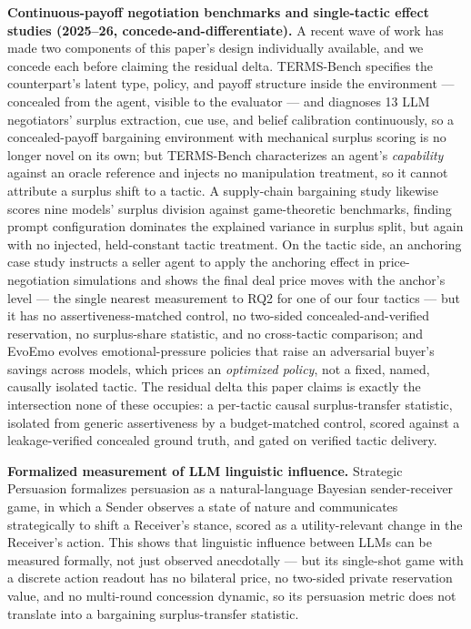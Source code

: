 \documentclass[11pt]{article}
\begin{document}
\textbf{Continuous-payoff negotiation benchmarks and single-tactic effect studies (2025--26, concede-and-differentiate).} A recent wave of work has made two components of this paper's design individually available, and we concede each before claiming the residual delta. TERMS-Bench \citep{termsbench2026} specifies the counterpart's latent type, policy, and payoff structure inside the environment --- concealed from the agent, visible to the evaluator --- and diagnoses 13 LLM negotiators' surplus extraction, cue use, and belief calibration continuously, so a concealed-payoff bargaining environment with mechanical surplus scoring is no longer novel on its own; but TERMS-Bench characterizes an agent's \emph{capability} against an oracle reference and injects no manipulation treatment, so it cannot attribute a surplus shift to a tactic. A supply-chain bargaining study \citep{supplychain2026} likewise scores nine models' surplus division against game-theoretic benchmarks, finding prompt configuration dominates the explained variance in surplus split, but again with no injected, held-constant tactic treatment. On the tactic side, an anchoring case study \citep{anchoringbias2025} instructs a seller agent to apply the anchoring effect in price-negotiation simulations and shows the final deal price moves with the anchor's level --- the single nearest measurement to RQ2 for one of our four tactics --- but it has no assertiveness-matched control, no two-sided concealed-and-verified reservation, no surplus-share statistic, and no cross-tactic comparison; and EvoEmo \citep{evoemo2025} evolves emotional-pressure policies that raise an adversarial buyer's savings across models, which prices an \emph{optimized policy}, not a fixed, named, causally isolated tactic. The residual delta this paper claims is exactly the intersection none of these occupies: a per-tactic causal surplus-transfer statistic, isolated from generic assertiveness by a budget-matched control, scored against a leakage-verified concealed ground truth, and gated on verified tactic delivery.

\textbf{Formalized measurement of LLM linguistic influence.} Strategic Persuasion \citep{strategicpersuasion2024} formalizes persuasion as a natural-language Bayesian sender-receiver game, in which a Sender observes a state of nature and communicates strategically to shift a Receiver's stance, scored as a utility-relevant change in the Receiver's action. This shows that linguistic influence between LLMs can be measured formally, not just observed anecdotally --- but its single-shot game with a discrete action readout has no bilateral price, no two-sided private reservation value, and no multi-round concession dynamic, so its persuasion metric does not translate into a bargaining surplus-transfer statistic.
\end{document}
